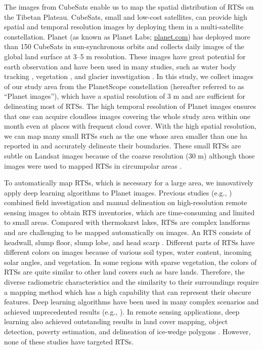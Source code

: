 \documentclass[preprint,12pt,authoryear]{elsarticle}
\begin{document}
The images from CubeSats enable us to map the spatial distribution of RTSs on the Tibetan Plateau. CubeSats, small and low-cost satellites, can provide high spatial and temporal resolution images by deploying them in a multi-satellite constellation. Planet (as known as Planet Labs; \url{planet.com}) has deployed more than 150 CubeSats in sun-synchronous orbits and collects daily images of the global land surface at 3--5 m resolution. These images have great potential for earth observation and have been used in many studies, such as water body tracking \citep{cooley2017tracking, cooley2019arctic, aragon2018cubesats, miles2018glacial}, vegetation \citep{houborg2016high, houborg2018daily}, and glacier investigation \citep{altena2017glacier}. In this study, we collect images of our study area from the PlanetScope constellation (hereafter referred to as “Planet images”), which have a spatial resolution of 3 m and are sufficient for delineating most of RTSs. The high temporal resolution of Planet images ensures that one can acquire cloudless images covering the whole study area within one month even at places with frequent cloud cover. With the high spatial resolution, we can map many small RTSs such as the one whose area smaller than one ha reported in \cite{niu2012development,niu2016thaw} and accurately delineate their boundaries. These small RTSs are subtle on Landsat images because of the coarse resolution (30 m) although those images were used to mapped RTSs in circumpolar areas \citep{lacelle_distribution_2015, brooker2014mapping, nitze2018remote}. %

To automatically map RTSs, which is necessary for a large area, we innovatively apply deep learning algorithms to Planet images. Previous studies (e.g., \citealp{ramage_terrain_2017, lantuit_fifty_2008, niu2014thaw}) combined field investigation and manual delineation on high-resolution remote sensing images to obtain RTS inventories, which are time-consuming and limited to small areas. Compared with thermokarst lakes, RTSs are complex landforms and are challenging to be mapped automatically on images. An RTS consists of headwall, slump floor, slump lobe, and head scarp \citep{lantuit_fifty_2008}. Different parts of RTSs have different colors on images because of various soil types, water content, incoming solar angles, and vegetation. In some regions with sparse vegetation, the colors of RTSs are quite similar to other land covers such as bare lands. Therefore, the diverse radiometric characteristics and the similarity to their surroundings require a mapping method which has a high capability that can represent their obscure features. Deep learning algorithms have been used in many complex scenarios and achieved unprecedented results (e.g., \citealp{krizhevsky_imagenet_2012, lecun_deep_2015, silver_mastering_2017}). In remote sensing applications, deep learning also achieved outstanding results in land cover mapping, object detection, poverty estimation, and delineation of ice-wedge polygons \citep{jean_combining_2016, guo_geospatial_2018, zhang2018deep}. However, none of these studies have targeted RTSs. 
\end{document}
